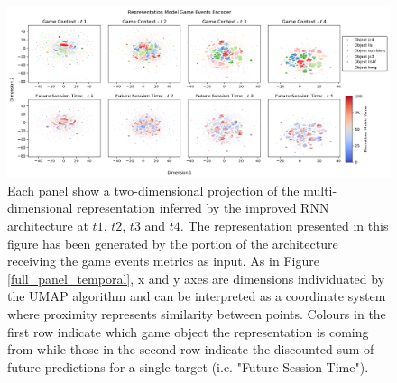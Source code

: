 \begin{figure}[ht]
\centering
\includegraphics[width=\textwidth]{images/chapter_4/RNN_env_even_0_lstm_layer_events_Future Session Time.png}
\caption[\textbf{Lower dimensional representation of the latent representations generated by the improved version of the RNN architecture from the game events metrics}]{Each panel show a two-dimensional projection of the multi-dimensional representation inferred by the improved RNN architecture at $t1$, $t2$, $t3$ and $t4$. The representation presented in this figure has been generated by the portion of the architecture receiving the game events metrics as input. As in Figure \ref{full_panel_temporal}, x and y axes are dimensions individuated by the UMAP algorithm and can be interpreted as a coordinate system where proximity represents similarity between points. Colours in the first row indicate which game object the representation is coming from while those in the second row indicate the discounted sum of future predictions for a single target (i.e. "Future Session Time").}
\label{rnn_env_even_full_events}
\end{figure}


